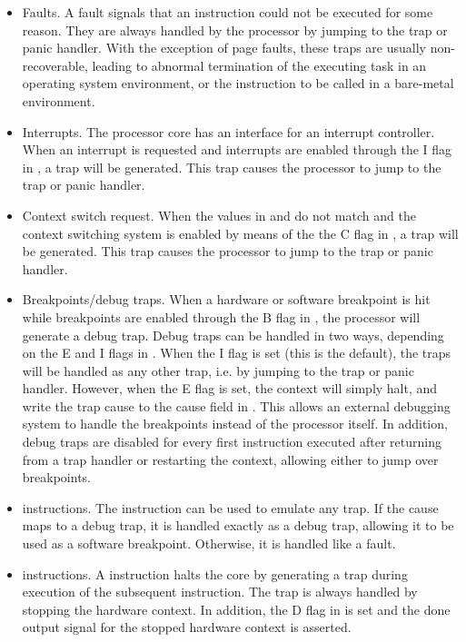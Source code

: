 \begin{itemize}

\item Faults. A fault signals that an instruction could not be executed for some
reason. They are always handled by the processor by jumping to the trap or panic
handler. With the exception of page faults, these traps are usually
non-recoverable, leading to abnormal termination of the executing task in an
operating system environment, or the  instruction to be called in a
bare-metal environment.

\item Interrupts. The \rvex{} processor core has an interface for an interrupt
controller. When an interrupt is requested and interrupts are enabled through
the I flag in , a  trap will be generated. This
trap causes the processor to jump to the trap or panic handler.

\item Context switch request. When the values in  and  do
not match and the context switching system is enabled by means of the the C flag
in , a  trap will be generated. This trap causes
the processor to jump to the trap or panic handler.

\item Breakpoints/debug traps. When a hardware or software breakpoint is hit 
while breakpoints are enabled through the B flag in , the processor 
will generate a debug trap. Debug traps can be handled in two ways, depending on 
the E and I flags in . When the I flag is set (this is the default), 
the traps will be handled as any other trap, i.e. by jumping to the trap or 
panic handler. However, when the E flag is set, the context will simply halt, 
and write the trap cause to the cause field in . This allows an 
external debugging system to handle the breakpoints instead of the processor 
itself. In addition, debug traps are disabled for every first instruction 
executed after returning from a trap handler or restarting the context, allowing 
either to jump over breakpoints.

\item {} instructions. The  instruction can be used to
emulate any trap. If the cause maps to a debug trap, it is handled exactly as a
debug trap, allowing it to be used as a software breakpoint. Otherwise, it is
handled like a fault.

\item {} instructions. A  instruction halts the core by
generating a  trap during execution of the subsequent instruction.
The  trap is always handled by stopping the hardware context. In
addition, the D flag in  is set and the done output signal for the
stopped hardware context is asserted.

\end{itemize}

